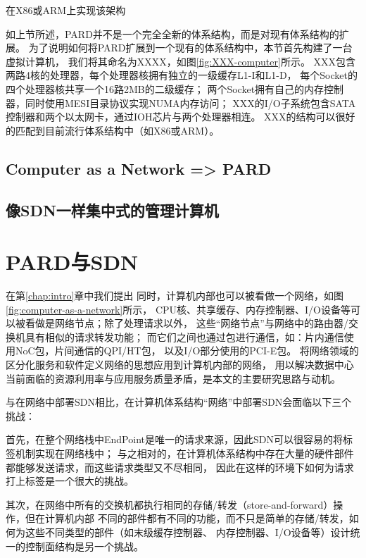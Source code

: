 在X86或ARM上实现该架构


如上节所述，PARD并不是一个完全全新的体系结构，而是对现有体系结构的扩展。
为了说明如何将PARD扩展到一个现有的体系结构中，本节首先构建了一台虚拟计算机，
我们将其命名为XXXX，如图\ref{fig:XXX-computer}所示。
XXX包含两路4核的处理器，每个处理器核拥有独立的一级缓存L1-I和L1-D，
每个Socket的四个处理器核共享一个16路2MB的二级缓存；
两个Socket拥有自己的内存控制器，同时使用MESI目录协议实现NUMA内存访问；
XXX的I/O子系统包含SATA控制器和两个以太网卡，通过IOH芯片与两个处理器相连。
XXX的结构可以很好的匹配到目前流行体系结构中（如X86或ARM）。

\subsection{Computer as a Network => PARD}

\subsection{像SDN一样集中式的管理计算机}

\section{PARD与SDN}

在第\ref{chap:intro}章中我们提出
同时，计算机内部也可以被看做一个网络，如图\ref{fig:computer-as-a-network}所示，
CPU核、共享缓存、内存控制器、I/O设备等可以被看做是网络节点；除了处理请求以外，
这些“网络节点”与网络中的路由器/交换机具有相似的请求转发功能；
而它们之间也通过包进行通信，如：片内通信使用NoC包，片间通信的QPI/HT包，
以及I/O部分使用的PCI-E包。
将网络领域的区分化服务和软件定义网络的思想应用到计算机内部的网络，
用以解决数据中心当前面临的资源利用率与应用服务质量矛盾，是本文的主要研究思路与动机。

与在网络中部署SDN相比，在计算机体系结构“网络”中部署SDN会面临以下三个挑战：

首先，在整个网络栈中EndPoint是唯一的请求来源，因此SDN可以很容易的将标签机制实现在网络栈中；
与之相对的，在计算机体系结构中存在大量的硬件部件都能够发送请求，而这些请求类型又不尽相同，
因此在这样的环境下如何为请求打上标签是一个很大的挑战。

其次，在网络中所有的交换机都执行相同的存储/转发（store-and-forward）操作，但在计算机内部
不同的部件都有不同的功能，而不只是简单的存储/转发，如何为这些不同类型的部件（如末级缓存控制器、
内存控制器、I/O设备等）设计统一的控制面结构是另一个挑战。

